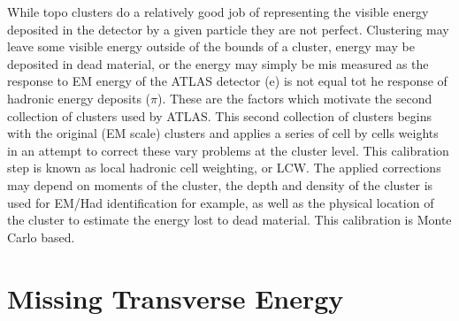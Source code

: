 While topo clusters do a relatively good job of representing the visible energy deposited in the detector by a given particle they are not perfect.  
Clustering may leave some visible energy outside of the bounds of a cluster, energy may be deposited in dead material, or the energy may simply be mis measured as the response to EM energy of the ATLAS detector (e) is not equal tot he response of hadronic energy deposits ($\pi$).  
These are the factors which motivate the second collection of clusters used by ATLAS.  
This second collection of clusters begins with the original (EM scale) clusters and applies a series of cell by cells weights in an attempt to correct these vary problems at the cluster level.  
This calibration step is known as local hadronic cell weighting, or LCW.  
The applied corrections may depend on moments of the cluster, the depth and density of the cluster is used for EM/Had identification for example, as well as the physical location of the cluster to estimate the energy lost to dead material.  
This calibration is Monte Carlo based.  



\section{Missing Transverse Energy}
